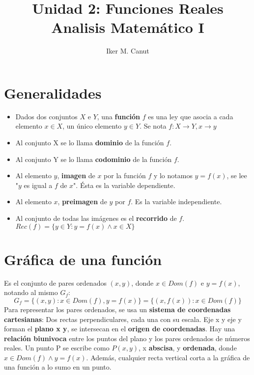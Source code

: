 \documentclass[11pt,a4paper]{article}
\author{Iker M. Canut}
\title{Unidad 2: Funciones Reales\\ Analisis Matem\'atico I}
\begin{document}
\maketitle
\newpage

\section{Generalidades}
\begin{itemize}
\item Dados dos conjuntos $X$ e $Y$, una \textbf{funci\'on} $f$ es una ley que asocia a cada elemento $x \in X$, un \'unico elemento $y \in Y$. Se nota $f : X \rightarrow Y, x \rightarrow y$
\item Al conjunto X se lo llama \textbf{dominio} de la funci\'on $f$.
\item Al conjunto Y se lo llama \textbf{codominio} de la funci\'on $f$.
\item Al elemento $y$, \textbf{imagen} de $x$ por la funci\'on $f$ y lo notamos $y = f(x)$, se lee "$y$ es igual a $f$ de $x$". \'Esta es la variable dependiente.
\item Al elemento $x$, \textbf{preimagen} de $y$ por $f$. Es la variable independiente.
\item Al conjunto de todas las im\'agenes es el \textbf{recorrido} de $f$. $Rec(f) = \{ y \in Y : y = f(x) \land x \in X \}$
\end{itemize}

\section{Gr\'afica de una funci\'on}
Es el conjunto de pares ordenados $(x,y)$, donde $x \in Dom(f)$ e $y = f(x)$, notando al mismo $G_f$:
$$G_f = \{ (x,y) : x \in Dom(f), y = f(x) \} = \{ (x, f(x)) : x \in Dom(f) \}$$
Para representar los pares ordenados, se usa un \textbf{sistema de coordenadas cartesianas}: Dos rectas perpendiculares, cada una con su escala. Eje x y eje y forman el \textbf{plano x y}, se intersecan en el \textbf{origen de coordenadas}. Hay una \textbf{relaci\'on biunivoca} entre los puntos del plano y los pares ordenados de n\'umeros reales. Un punto P se escribe como $P(x,y)$, x \textbf{abscisa}, y \textbf{ordenada}, donde $x \in Dom(f) \land y = f(x)$. Adem\'as, cualquier recta vertical corta a la gr\'afica de una funci\'on a lo sumo en un punto.
\end{document}
